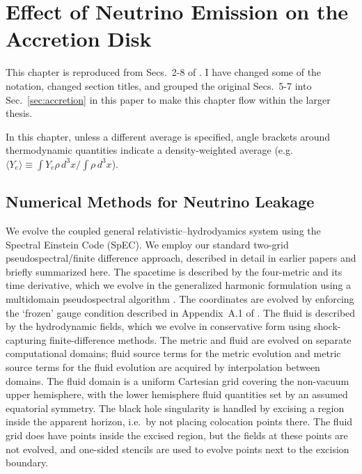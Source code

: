 \chapter{Effect of Neutrino Emission on the Accretion Disk}
\label{chap:leakage}

This chapter is reproduced from Secs.~2-8 of \citealt{deat2013-leakage}.
I have changed some of the notation, changed section titles, and grouped
the original Secs.~5-7 into Sec.~\ref{sec:accretion} in this paper to make this
chapter flow within the larger thesis.

In this chapter, unless a different average is specified, angle brackets around
thermodynamic quantities indicate a density-weighted average
(e.g.\ $\langle Y_e \rangle \equiv \int Y_e \rho\, d^3x/ \int \rho\, d^3x$).

\section{Numerical Methods for Neutrino Leakage}
\label{sec:Methods}

We evolve the coupled general relativistic--hydrodyamics system using
the Spectral Einstein Code (SpEC).
We employ our standard two-grid pseudospectral/finite difference approach,
described in detail in earlier papers
\citep{sche2006-dual_frames,duez2008-first_spec_bhns,hemb2012-dynamical_excision,fouc2013-compactness_and_spin}
and briefly summarized here. The spacetime is described by the four-metric and
its time derivative, which we evolve in the generalized harmonic formulation using a multidomain
pseudospectral algorithm \citep{lind2007-gen_harmonic}.
The coordinates are evolved by enforcing the `frozen' gauge condition described
in Appendix~A.1 of \cite{fouc2013-compactness_and_spin}.
The fluid is described by the hydrodynamic fields,
which we evolve in conservative form using shock-capturing finite-difference
methods.  The metric and fluid are evolved on separate computational domains;
fluid source terms for the metric evolution and metric source terms for the
fluid evolution are acquired by interpolation between domains.  The fluid
domain is a uniform Cartesian grid covering the non-vacuum upper hemisphere,
with the lower hemisphere fluid quantities set by an assumed equatorial
symmetry. The black hole singularity is handled by excising
a region inside the apparent horizon, i.e.\ by not placing colocation points
there.  The fluid grid does have points inside the excised region, but the fields
at these points are not evolved, and one-sided stencils are used to evolve points next
to the excision boundary.

